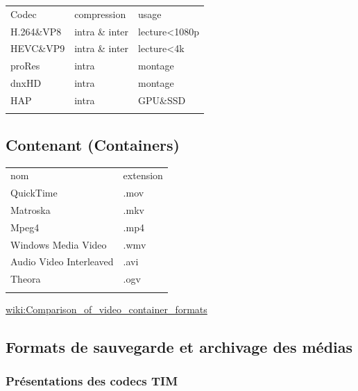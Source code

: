 \documentclass[
  french,
]{book}
\begin{document}
\begin{longtable}[]{@{}lll@{}}
\toprule
Codec & compression & usage \\ \addlinespace
\midrule
\endhead
H.264\&VP8 & intra \& inter & lecture\textless1080p \\ \addlinespace
HEVC\&VP9 & intra \& inter & lecture\textless4k \\ \addlinespace
proRes & intra & montage \\ \addlinespace
dnxHD & intra & montage \\ \addlinespace
HAP & intra & GPU\&SSD \\ \addlinespace
\bottomrule
\end{longtable}

\hypertarget{contenant-containers}{%
\subsection{Contenant (Containers)}\label{contenant-containers}}

\begin{longtable}[]{@{}ll@{}}
\toprule
nom & extension \\ \addlinespace
\midrule
\endhead
QuickTime & .mov \\ \addlinespace
Matroska & .mkv \\ \addlinespace
Mpeg4 & .mp4 \\ \addlinespace
Windows Media Video & .wmv \\ \addlinespace
Audio Video Interleaved & .avi \\ \addlinespace
Theora & .ogv \\ \addlinespace
\bottomrule
\end{longtable}

\href{https://en.wikipedia.org/wiki/Comparison_of_video_container_formats}{wiki:Comparison\_of\_video\_container\_formats}

\hypertarget{formats-de-sauvegarde-et-archivage-des-muxe9dias}{%
\subsection{Formats de sauvegarde et archivage des médias}\label{formats-de-sauvegarde-et-archivage-des-muxe9dias}}

\hypertarget{pruxe9sentations-des-codecs-tim}{%
\subsubsection{Présentations des codecs TIM}\label{pruxe9sentations-des-codecs-tim}}
\end{document}
